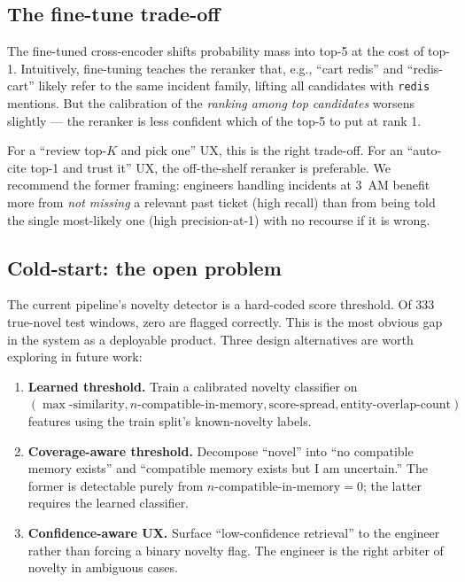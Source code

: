 \subsection{The fine-tune trade-off}

The fine-tuned cross-encoder shifts probability mass into top-5 at the cost of top-1. Intuitively, fine-tuning teaches the reranker that, e.g., ``cart redis'' and ``redis-cart'' likely refer to the same incident family, lifting all candidates with \texttt{redis} mentions. But the calibration of the \emph{ranking among top candidates} worsens slightly --- the reranker is less confident which of the top-5 to put at rank 1.

For a ``review top-$K$ and pick one'' UX, this is the right trade-off. For an ``auto-cite top-1 and trust it'' UX, the off-the-shelf reranker is preferable. We recommend the former framing: engineers handling incidents at 3~AM benefit more from \emph{not missing} a relevant past ticket (high recall) than from being told the single most-likely one (high precision-at-1) with no recourse if it is wrong.

\subsection{Cold-start: the open problem}

The current pipeline's novelty detector is a hard-coded score threshold. Of 333 true-novel test windows, zero are flagged correctly. This is the most obvious gap in the system as a deployable product. Three design alternatives are worth exploring in future work:

\begin{enumerate}
    \item \textbf{Learned threshold.} Train a calibrated novelty classifier on $(\max\text{-similarity}, n\text{-compatible-in-memory}, \text{score-spread}, \text{entity-overlap-count})$ features using the train split's known-novelty labels.
    \item \textbf{Coverage-aware threshold.} Decompose ``novel'' into ``no compatible memory exists'' and ``compatible memory exists but I am uncertain.'' The former is detectable purely from $n\text{-compatible-in-memory}=0$; the latter requires the learned classifier.
    \item \textbf{Confidence-aware UX.} Surface ``low-confidence retrieval'' to the engineer rather than forcing a binary novelty flag. The engineer is the right arbiter of novelty in ambiguous cases.
\end{enumerate}

